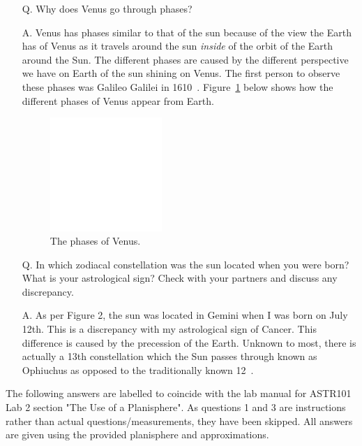 \documentclass{article}
\begin{document}
\begin{enumerate}
\item[Q.] Why does Venus go through phases? 
\item[A.] Venus has phases similar to that of the sun because of the view the Earth has of Venus as it travels
around the sun \textit{inside} of the orbit of the Earth around the Sun. The different phases are caused by the different
perspective we have on Earth of the sun shining on Venus.  The first person to observe these phases was Galileo 
Galilei in 1610~\cite{Lance:1995}. Figure~\ref{fig:pov} below shows how the different phases of
Venus appear from Earth.

\addtocounter{figure}{2}
\begin{figure}[h!]
\centering
\includegraphics[width=0.4\textwidth]{images/blank}
\caption{The phases of Venus.\label{fig:pov}}
\end{figure}

\item[Q.] In which zodiacal constellation was the sun located when you were born? What is your astrological sign?
Check with your partners and discuss any discrepancy.
\item[A.] As per Figure 2, the sun was located in Gemini when I was born on July 12th. This is a discrepancy with
my astrological sign of Cancer. This difference is caused by the precession of the Earth. Unknown to most, there
is actually a 13th constellation which the Sun passes through known as Ophiuchus as opposed to the 
traditionally known 12~\cite{Storm:1995}.
\end{enumerate}

The following answers are labelled to coincide with the lab manual for ASTR101 Lab 2 section
"The Use of a Planisphere". As
questions 1 and 3 are instructions rather than actual questions/measurements, they have been skipped. All answers 
are given using the provided planisphere and approximations.
\end{document}
